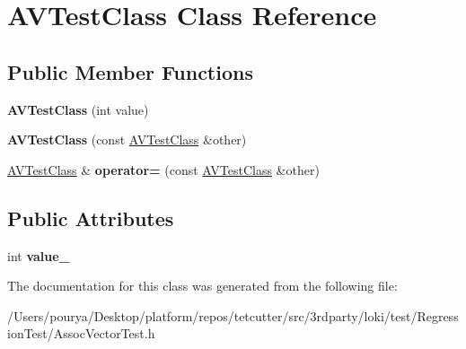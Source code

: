 \hypertarget{classAVTestClass}{}\section{A\+V\+Test\+Class Class Reference}
\label{classAVTestClass}
\subsection*{Public Member Functions}
\begin{DoxyCompactItemize}
\item 
\hypertarget{classAVTestClass_ac33af1f5a90b05231703cded6bf8b881}{}{\bfseries A\+V\+Test\+Class} (int value)\label{classAVTestClass_ac33af1f5a90b05231703cded6bf8b881}

\item 
\hypertarget{classAVTestClass_afb64d0873d38679244a422cbcbed1687}{}{\bfseries A\+V\+Test\+Class} (const \hyperlink{classAVTestClass}{A\+V\+Test\+Class} \&other)\label{classAVTestClass_afb64d0873d38679244a422cbcbed1687}

\item 
\hypertarget{classAVTestClass_a934937f5fb6ddf6111a638675d5db116}{}\hyperlink{classAVTestClass}{A\+V\+Test\+Class} \& {\bfseries operator=} (const \hyperlink{classAVTestClass}{A\+V\+Test\+Class} \&other)\label{classAVTestClass_a934937f5fb6ddf6111a638675d5db116}

\end{DoxyCompactItemize}
\subsection*{Public Attributes}
\begin{DoxyCompactItemize}
\item 
\hypertarget{classAVTestClass_a7f5ba401a40e5a87d2bcbba45ffcd5d4}{}int {\bfseries value\+\_\+}\label{classAVTestClass_a7f5ba401a40e5a87d2bcbba45ffcd5d4}

\end{DoxyCompactItemize}


The documentation for this class was generated from the following file\+:\begin{DoxyCompactItemize}
\item 
/\+Users/pourya/\+Desktop/platform/repos/tetcutter/src/3rdparty/loki/test/\+Regression\+Test/Assoc\+Vector\+Test.\+h\end{DoxyCompactItemize}
